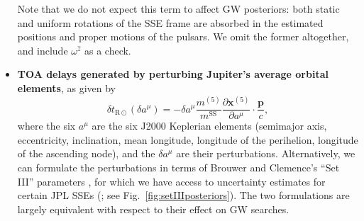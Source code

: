 \documentclass[iop,apj,twocolappendix]{emulateapj}
\begin{document}
\begin{itemize}
Note that we do not expect this term to affect GW posteriors: both static and uniform rotations of the SSE frame are absorbed in the estimated positions and proper motions of the pulsars. We omit the former altogether, and include $\omega^{\hat{z}}$ as a check.
%
\item \textbf{TOA delays generated by perturbing Jupiter's average orbital elements}, as given by
\begin{equation}
\label{eq:orbitperturb}
    \delta t_{\mathrm{R}\odot}(\delta a^\mu) = -\delta a^\mu
    \frac{m^{(5)}}{m^\mathrm{SS}} \frac{\partial \mathbf{x}^{(5)}}{\partial a^\mu} \cdot \frac{\mathbf{p}}{c},
\end{equation}
%
where the six $a^\mu$ are the six J2000 Keplerian elements (semimajor axis, eccentricity, inclination, mean longitude, longitude of the perihelion, longitude of the ascending node), and the $\delta a^\mu$ are their perturbations. Alternatively, we can formulate the perturbations in terms of Brouwer and Clemence's ``Set III'' parameters \citep{1961mcm..book.....B}, for which we have access to uncertainty estimates for certain JPL SSEs (\citealt{de434,de438}; see Fig.\ \ref{fig:setIIIposteriors}). The two formulations are largely equivalent with respect to their effect on GW searches.


\end{itemize}
\end{document}
